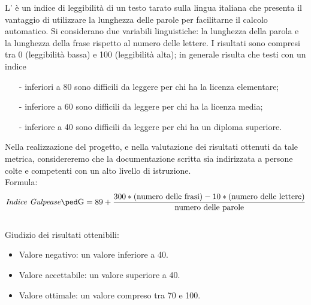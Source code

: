 \documentclass[a4paper, titlepage]{article}
\begin{document}
\label{par:IG}
L' è un indice di leggibilità di un testo tarato sulla lingua italiana che presenta il vantaggio di utilizzare la lunghezza delle parole per facilitarne il calcolo automatico. Si considerano due variabili linguistiche: la lunghezza della parola e la lunghezza della frase rispetto al numero delle lettere.
\newline I risultati sono compresi tra 0 (leggibilità bassa) e 100 (leggibilità alta); in generale risulta che testi con un indice
\begin{itemize}
\item[-]inferiori a 80 sono difficili da leggere per chi ha la
licenza elementare;
\item[-]inferiore a 60 sono difficili da leggere per chi ha la
licenza media;
\item[-]inferiore a 40 sono difficili da leggere per chi ha un
diploma superiore.
\end{itemize}
Nella realizzazione del progetto, e nella valutazione dei risultati ottenuti da tale metrica, considereremo che la documentazione scritta sia indirizzata a persone colte e competenti con un alto livello di istruzione.
\\
\newline Formula:
\begin{displaymath}
\mbox{\gl{Indice Gulpease}}= 89+\frac{300*\mbox{(numero delle frasi)}-10*\mbox{(numero delle lettere)}}{\mbox{numero delle parole}}
\end{displaymath}
\\
\newline Giudizio dei risultati ottenibili:
\begin{itemize}
\item Valore negativo: un valore inferiore a 40. 
\item Valore accettabile: un valore superiore a 40.
\item Valore ottimale: un valore compreso tra 70 e 100.
\end{itemize}
\end{document}
